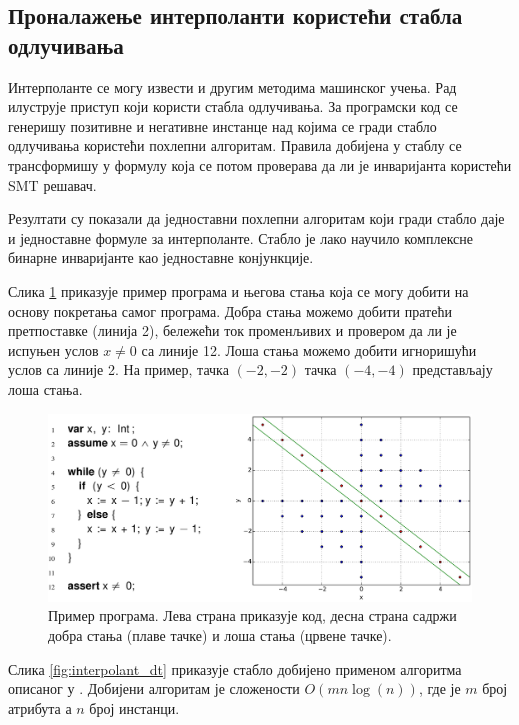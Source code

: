 \documentclass[a4paper]{article}
\begin{document}
{\subsection{Проналажење интерполанти користећи стабла одлучивања}
\label{sssec:interpolant_dt}

Интерполанте се могу извести и другим методима машинског учења. Рад \cite{KrishnaPW15} илуструје приступ који
користи стабла одлучивања. За програмски код се генеришу позитивне и негативне инстанце над којима се гради
стабло одлучивања користећи похлепни алгоритам. Правила добијена у стаблу се трансформишу у формулу која
се потом проверава да ли је инваријанта користећи \textsc{SMT} решавач.

Резултати су показали да једноставни похлепни алгоритам који гради стабло даје и једноставне формуле
за интерполанте. Стабло је лако научило комплексне бинарне инваријанте као једноставне конјункције.

Слика \ref{fig:interpolant_example2} приказује пример програма и његова стања која се могу добити на основу
покретања самог програма. Добра стања можемо добити пратећи претпоставке (линија 2), бележећи ток променљивих
и провером да ли је испуњен услов $x \neq 0$ са линије 12. Лоша стања можемо добити игноришући услов са линије 2.
На пример, тачка $(-2, -2)$ тачка $(-4, -4)$ представљају лоша стања.

\begin{figure}[h!]
\begin{center}
\includegraphics[scale=0.14]{./slike/interpolant2.png}
\end{center}
    \caption{Пример програма. Лева страна приказује код, десна страна садржи добра стања (плаве тачке) и лоша
    стања (црвене тачке).}
\label{fig:interpolant_example2}
\end{figure}

Слика \ref{fig:interpolant_dt} приказује стабло добијено применом алгоритма описаног у \cite{KrishnaPW15}.
Добијени алгоритам је сложености $O(mn \log(n))$, где је $m$ број атрибута а $n$ број инстанци.

}
\end{document}
